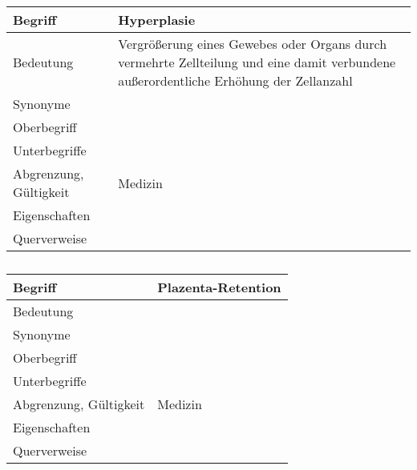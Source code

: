 \begin{table}[h]
	\centering	
	\begin{tabular}{ p{4.5cm} p{10.5cm} } 
		\toprule[1pt]
		\rowcolor{maroon!30}
		\textbf{Begriff} &  \textbf{Hyperplasie}\\		
		\midrule
	
		Bedeutung  & Vergrößerung eines Gewebes oder Organs durch vermehrte Zellteilung und eine damit verbundene außerordentliche Erhöhung der Zellanzahl\\		
		Synonyme  & \\				
		Oberbegriff  &  \\		
		Unterbegriffe   & \\		
		Abgrenzung, Gültigkeit  & Medizin\\				
		Eigenschaften  & \\			
		Querverweise  & \\
		\bottomrule					
		
	\end{tabular}
	\label{tab: Glossareintrag zu Hyperplasie}
	\caption{}
\end{table}



\begin{table}[h]
	\centering	
	\begin{tabular}{ p{4.5cm} p{10.5cm} } 
		\toprule[1pt]
		\rowcolor{maroon!30}
		\textbf{Begriff} &  \textbf{Plazenta-Retention}\\
		\midrule
		Bedeutung  &\\		
		Synonyme  & \\				
		Oberbegriff  &  \\		
		Unterbegriffe   &\\		
		Abgrenzung, Gültigkeit  & Medizin\\				
		Eigenschaften  & \\			
		Querverweise  & \\	
		\bottomrule				
		
	\end{tabular}
	\label{tab: Glossareintrag zu Plazenta-Retention}
	\caption{}
\end{table}


